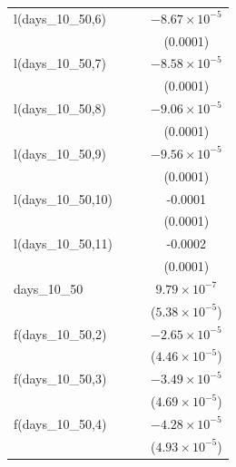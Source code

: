 \begin{tabular}{lccc}
   l(days\_10\_50,6)                &          &                       & $-8.67\times 10^{-5}$\\    
                                    &          &                       & (0.0001)\\   
   l(days\_10\_50,7)                &          &                       & $-8.58\times 10^{-5}$\\    
                                    &          &                       & (0.0001)\\   
   l(days\_10\_50,8)                &          &                       & $-9.06\times 10^{-5}$\\    
                                    &          &                       & (0.0001)\\   
   l(days\_10\_50,9)                &          &                       & $-9.56\times 10^{-5}$\\    
                                    &          &                       & (0.0001)\\   
   l(days\_10\_50,10)               &          &                       & -0.0001\\   
                                    &          &                       & (0.0001)\\   
   l(days\_10\_50,11)               &          &                       & -0.0002\\   
                                    &          &                       & (0.0001)\\   
   days\_10\_50                     &          &                       & $9.79\times 10^{-7}$\\    
                                    &          &                       & ($5.38\times 10^{-5}$)\\    
   f(days\_10\_50,2)                &          &                       & $-2.65\times 10^{-5}$\\    
                                    &          &                       & ($4.46\times 10^{-5}$)\\    
   f(days\_10\_50,3)                &          &                       & $-3.49\times 10^{-5}$\\    
                                    &          &                       & ($4.69\times 10^{-5}$)\\    
   f(days\_10\_50,4)                &          &                       & $-4.28\times 10^{-5}$\\    
                                    &          &                       & ($4.93\times 10^{-5}$)\\    

\end{tabular}
